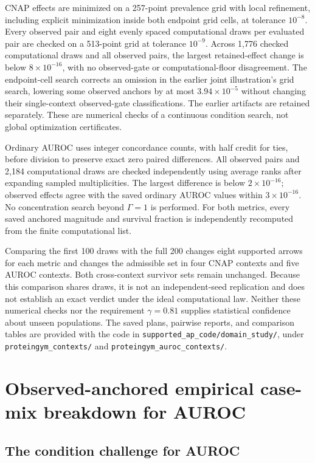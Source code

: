 \documentclass[11pt]{article}
\theoremstyle{remark}
\begin{document}
CNAP effects are minimized on a 257-point prevalence grid with local
refinement, including explicit minimization inside both endpoint grid cells,
at tolerance $10^{-8}$. Every observed pair and eight evenly spaced
computational draws per evaluated pair are checked on a 513-point grid at
tolerance $10^{-9}$. Across 1,776 checked computational draws and all observed
pairs, the largest retained-effect change is below $8\times10^{-16}$, with no
observed-gate or computational-floor disagreement. The endpoint-cell search
corrects an omission in the earlier joint illustration's grid search, lowering
some observed anchors by at most $3.94\times10^{-5}$ without changing their
single-context observed-gate classifications. The earlier artifacts are
retained separately. These are numerical checks of a continuous condition
search, not global optimization certificates.

Ordinary AUROC uses integer concordance counts, with half credit for ties,
before division to preserve exact zero paired differences. All observed
pairs and 2,184 computational draws are checked independently using average
ranks after expanding sampled multiplicities. The largest difference is below
$2\times10^{-16}$; observed effects agree with the saved ordinary AUROC
values within $3\times10^{-16}$. No concentration search beyond $\Gamma=1$
is performed. For both metrics, every saved anchored magnitude and survival
fraction is independently recomputed from the finite computational list.

Comparing the first 100 draws with the full 200 changes eight supported
arrows for each metric and changes the admissible set in four CNAP contexts
and five AUROC contexts. Both cross-context survivor sets remain unchanged.
Because this comparison shares draws, it is not an independent-seed
replication and does not establish an exact verdict under the ideal
computational law. Neither these numerical checks nor the requirement
$\gamma=0.81$ supplies statistical confidence about unseen populations.
The saved plans, pairwise reports, and comparison tables are provided with
the code in \texttt{supported\_ap\_code/domain\_study/}, under
\texttt{proteingym\_contexts/} and \texttt{proteingym\_auroc\_contexts/}.

\section{Observed-anchored empirical case-mix breakdown for AUROC}
\label{app:auroc}

\subsection{The condition challenge for AUROC}
\end{document}
